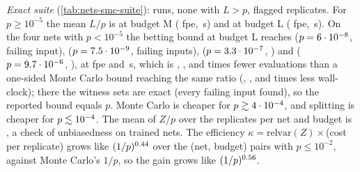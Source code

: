 \emph{Exact suite} (\cref{tab:nets-smc-suite}): \nnSuiteRuns{} runs, none with $L>p$,
\nnSuiteFlagged{} flagged replicates. For $p\ge10^{-5}$ the mean $L/p$ is
\nnSuiteRatioM{} at budget M (\nnSuiteFpeM{} fpe, \nnSuiteSecM{}\,s) and \nnSuiteRatioL{}
at budget L (\nnSuiteFpeL{} fpe, \nnSuiteSecL{}\,s). On the four nets with
$p<10^{-5}$ the betting bound at budget L reaches \nnSmallARatio{}
($p=6\cdot10^{-8}$, \nnSmallAF{} failing input), \nnSmallBRatio{} ($p=7.5\cdot10^{-9}$,
\nnSmallBF{} failing inputs), \nnSmallCRatio{} ($p=3.3\cdot10^{-7}$, \nnSmallCF{}) and
\nnSmallDRatio{} ($p=9.7\cdot10^{-6}$, \nnSmallDF{}), at \nnSmallFpe{} fpe and
\nnSmallSec{}\,s, which is \nnSmallAKL{}, \nnSmallBKL{}, \nnSmallCKL{} and \nnSmallDKL{}
times fewer evaluations than a one-sided Monte Carlo bound reaching the same ratio
(\nnSmallAKLs{}, \nnSmallBKLs{}, \nnSmallCKLs{} and \nnSmallDKLs{} times less
wall-clock); there the witness sets are exact (every failing input found), so the
reported bound equals $p$. Monte Carlo is cheaper for $p\gtrsim4\cdot10^{-4}$, and
splitting is cheaper for $p\lesssim10^{-4}$. The mean of $Z/p$ over the
\nnEffReps{} replicates per net and budget is \nnMeanZRange{}, a check of
unbiasedness on trained nets. The efficiency $\kappa=\mathrm{relvar}(Z)\times$(cost per
replicate) grows like $(1/p)^{0.44}$ over the \nnEffRows{} (net, budget) pairs
with $p\le10^{-2}$, against Monte Carlo's $1/p$, so the gain grows like
$(1/p)^{0.56}$.


